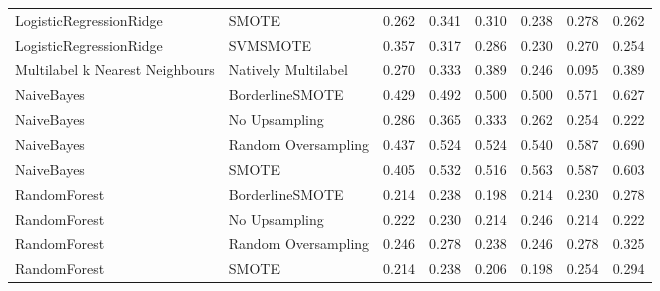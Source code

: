 \begin{tabular}{llllllll}
        LogisticRegressionRidge &                         SMOTE & 0.262 &                     0.341 &                 0.310 &                  0.238 &                                   0.278 &     0.262 \\
        LogisticRegressionRidge &                      SVMSMOTE & 0.357 &                     0.317 &                 0.286 &                  0.230 &                                   0.270 &     0.254 \\
Multilabel k Nearest Neighbours &           Natively Multilabel & 0.270 &                     0.333 &                 0.389 &                  0.246 &                                   0.095 &     0.389 \\
                     NaiveBayes &               BorderlineSMOTE & 0.429 &                     0.492 &                 0.500 &                  0.500 &                                   0.571 &     0.627 \\
                     NaiveBayes &                 No Upsampling & 0.286 &                     0.365 &                 0.333 &                  0.262 &                                   0.254 &     0.222 \\
                     NaiveBayes &           Random Oversampling & 0.437 &                     0.524 &                 0.524 &                  0.540 &                                   0.587 &     0.690 \\
                     NaiveBayes &                         SMOTE & 0.405 &                     0.532 &                 0.516 &                  0.563 &                                   0.587 &     0.603 \\
                   RandomForest &               BorderlineSMOTE & 0.214 &                     0.238 &                 0.198 &                  0.214 &                                   0.230 &     0.278 \\
                   RandomForest &                 No Upsampling & 0.222 &                     0.230 &                 0.214 &                  0.246 &                                   0.214 &     0.222 \\
                   RandomForest &           Random Oversampling & 0.246 &                     0.278 &                 0.238 &                  0.246 &                                   0.278 &     0.325 \\
                   RandomForest &                         SMOTE & 0.214 &                     0.238 &                 0.206 &                  0.198 &                                   0.254 &     0.294 \\

\end{tabular}
